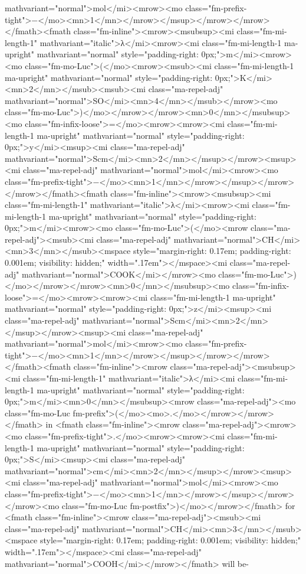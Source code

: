 \documentclass{article}
\begin{document}
mathvariant="normal">mol</mi><mrow><mo class="fm-prefix-tight">−</mo><mn>1</mn></mrow></msup></mrow></mrow></fmath>\newline<fmath class="fm-inline"><mrow><msubsup><mi class="fm-mi-length-1" mathvariant="italic">λ</mi><mrow><mi class="fm-mi-length-1 ma-upright" mathvariant="normal" style="padding-right: 0px;">m</mi><mrow><mo class="fm-mo-Luc">(</mo><mrow><msub><mi class="fm-mi-length-1 ma-upright" mathvariant="normal" style="padding-right: 0px;">K</mi><mn>2</mn></msub><msub><mi class="ma-repel-adj" mathvariant="normal">SO</mi><mn>4</mn></msub></mrow><mo class="fm-mo-Luc">)</mo></mrow></mrow><mn>0</mn></msubsup><mo class="fm-infix-loose">=</mo><mrow><mrow><mi class="fm-mi-length-1 ma-upright" mathvariant="normal" style="padding-right: 0px;">y</mi><msup><mi class="ma-repel-adj" mathvariant="normal">Scm</mi><mn>2</mn></msup></mrow><msup><mi class="ma-repel-adj" mathvariant="normal">mol</mi><mrow><mo class="fm-prefix-tight">−</mo><mn>1</mn></mrow></msup></mrow></mrow></fmath>\newline<fmath class="fm-inline"><mrow><msubsup><mi class="fm-mi-length-1" mathvariant="italic">λ</mi><mrow><mi class="fm-mi-length-1 ma-upright" mathvariant="normal" style="padding-right: 0px;">m</mi><mrow><mo class="fm-mo-Luc">(</mo><mrow class="ma-repel-adj"><msub><mi class="ma-repel-adj" mathvariant="normal">CH</mi><mn>3</mn></msub><mspace style="margin-right: 0.17em; padding-right: 0.001em; visibility: hidden;" width=".17em">‌</mspace><mi class="ma-repel-adj" mathvariant="normal">COOK</mi></mrow><mo class="fm-mo-Luc">)</mo></mrow></mrow><mn>0</mn></msubsup><mo class="fm-infix-loose">=</mo><mrow><mrow><mi class="fm-mi-length-1 ma-upright" mathvariant="normal" style="padding-right: 0px;">z</mi><msup><mi class="ma-repel-adj" mathvariant="normal">Scm</mi><mn>2</mn></msup></mrow><msup><mi class="ma-repel-adj" mathvariant="normal">mol</mi><mrow><mo class="fm-prefix-tight">−</mo><mn>1</mn></mrow></msup></mrow></mrow></fmath>\newline<fmath class="fm-inline"><mrow class="ma-repel-adj"><msubsup><mi class="fm-mi-length-1" mathvariant="italic">λ</mi><mi class="fm-mi-length-1 ma-upright" mathvariant="normal" style="padding-right: 0px;">m</mi><mn>0</mn></msubsup><mrow class="ma-repel-adj"><mo class="fm-mo-Luc fm-prefix">(</mo><mo>.</mo></mrow></mrow></fmath> in <fmath class="fm-inline"><mrow class="ma-repel-adj"><mrow><mo class="fm-prefix-tight">.</mo><mrow><mrow><mi class="fm-mi-length-1 ma-upright" mathvariant="normal" style="padding-right: 0px;">S</mi><msup><mi class="ma-repel-adj" mathvariant="normal">cm</mi><mn>2</mn></msup></mrow><msup><mi class="ma-repel-adj" mathvariant="normal">mol</mi><mrow><mo class="fm-prefix-tight">−</mo><mn>1</mn></mrow></msup></mrow></mrow><mo class="fm-mo-Luc fm-postfix">)</mo></mrow></fmath> for <fmath class="fm-inline"><mrow class="ma-repel-adj"><msub><mi class="ma-repel-adj" mathvariant="normal">CH</mi><mn>3</mn></msub><mspace style="margin-right: 0.17em; padding-right: 0.001em; visibility: hidden;" width=".17em">‌</mspace><mi class="ma-repel-adj" mathvariant="normal">COOH</mi></mrow></fmath> will be-\newline 
\end{document}
